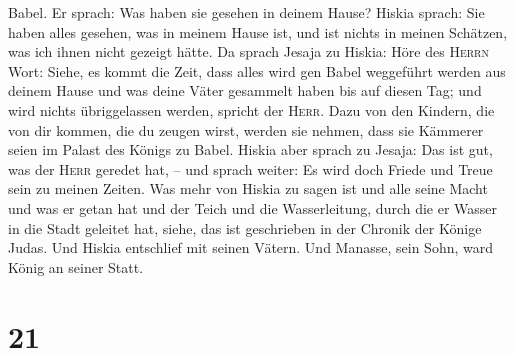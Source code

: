 Babel.  Er sprach: Was haben sie gesehen in deinem Hause?
Hiskia sprach: Sie haben alles gesehen, was in meinem Hause ist, und ist
nichts in meinen Schätzen, was ich ihnen nicht gezeigt hätte.
 Da sprach Jesaja zu Hiskia: Höre des \textsc{Herrn}
Wort:  Siehe, es kommt die Zeit, dass alles wird gen
Babel weggeführt werden aus deinem Hause und was deine Väter gesammelt
haben bis auf diesen Tag; und wird nichts übriggelassen werden, spricht
der \textsc{Herr}.  Dazu von den Kindern, die von dir
kommen, die du zeugen wirst, werden sie nehmen, dass sie Kämmerer seien
im Palast des Königs zu Babel.  Hiskia aber sprach zu
Jesaja: Das ist gut, was der \textsc{Herr} geredet hat, -- und sprach
weiter: Es wird doch Friede und Treue sein zu meinen Zeiten.
 Was mehr von Hiskia zu sagen ist und alle seine Macht
und was er getan hat und der Teich und die Wasserleitung, durch die er
Wasser in die Stadt geleitet hat, siehe, das ist geschrieben in der
Chronik der Könige Judas.  Und Hiskia entschlief mit
seinen Vätern. Und Manasse, sein Sohn, ward König an seiner Statt.

\hypertarget{section-20}{%
\section{21}\label{section-20}}

